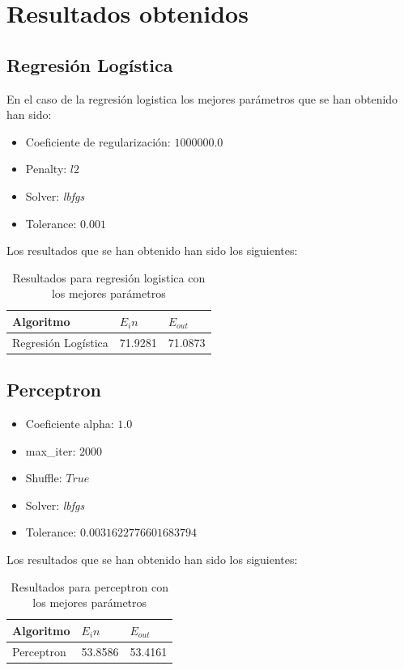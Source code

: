 \documentclass[a4paper,11pt]{article}
\begin{document}
\section{Resultados obtenidos}

\subsection{Regresión Logística}

En el caso de la regresión logistica los mejores parámetros que se han obtenido 
han sido:

\begin{itemize}
    \item Coeficiente de regularización: $1000000.0$
    \item Penalty: $l2$
    \item Solver: \textit{lbfgs}
    \item Tolerance: $0.001$
\end{itemize}

Los resultados que se han obtenido han sido los siguientes:

\begin{table}[h!]
\centering
\begin{tabular}{|l|l|l|}
\hline
Algoritmo    & $E_in$  & $E_{out}$ \\ \hline
 Regresión Logística   & 71.9281 & 71.0873 \\ \hline
\end{tabular}
\caption{Resultados para regresión logistica con los mejores parámetros}
\end{table}

\subsection{Perceptron}

\begin{itemize}
    \item Coeficiente alpha: $1.0$
    \item max\_iter: $2000$
    \item Shuffle: $True$
    \item Solver: \textit{lbfgs}
    \item Tolerance: $0.0031622776601683794$
\end{itemize}

Los resultados que se han obtenido han sido los siguientes:

\begin{table}[h!]
\centering
\begin{tabular}{|l|l|l|}
\hline
Algoritmo    & $E_in$  & $E_{out}$ \\ \hline
Perceptron & 53.8586 & 53.4161 \\ \hline
\end{tabular}
\caption{Resultados para perceptron con los mejores parámetros }
\end{table}
\end{document}
